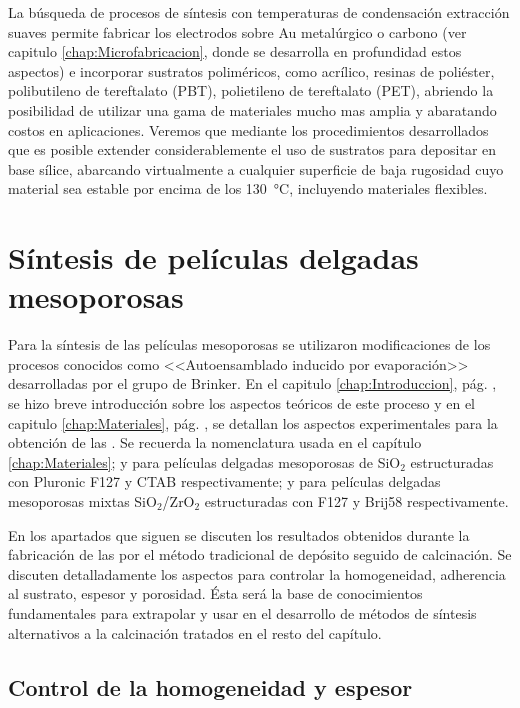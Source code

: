	La búsqueda de procesos de síntesis con temperaturas de condensación extracción suaves permite fabricar los electrodos sobre Au metalúrgico o carbono (ver capitulo \ref{chap:Microfabricacion}, donde se desarrolla en profundidad estos aspectos) e incorporar sustratos poliméricos, como acrílico, resinas de poliéster, polibutileno de tereftalato (PBT), polietileno de tereftalato (PET), abriendo la posibilidad de utilizar una gama de materiales mucho mas amplia y abaratando costos en aplicaciones.	Veremos que mediante los procedimientos desarrollados que es posible extender considerablemente el uso de sustratos para depositar \pdm\space en base sílice, abarcando virtualmente a cualquier superficie de baja rugosidad cuyo material sea estable por encima de los \SI{130}{\celsius}, incluyendo materiales flexibles.
	
\section{Síntesis de películas delgadas mesoporosas}
		
		Para la síntesis de las películas mesoporosas se utilizaron modificaciones de los procesos conocidos como <<Autoensamblado inducido por evaporación>> desarrolladas por el grupo de Brinker.\cite{Brinker1999} En el capitulo \ref{chap:Introduccion}, pág. \pageref{sec:mesoporosos}, se hizo breve introducción sobre los aspectos teóricos de este proceso y en el capitulo \ref{chap:Materiales}, pág. \pageref{sec:sintesis_mesoporosos}, se detallan los aspectos experimentales para la obtención de las \pdm. Se recuerda la nomenclatura usada en el capítulo \ref{chap:Materiales}; \pdmF\space y \pdmC\space para películas delgadas mesoporosas de SiO$_2$ estructuradas con Pluronic F127 y CTAB respectivamente; \pdmZ\space y \pdmZB\space para películas delgadas mesoporosas mixtas SiO$_2$/ZrO$_2$ estructuradas con F127 y Brij58 respectivamente.

		En los apartados que siguen se discuten los resultados obtenidos durante la fabricación de las \pdm\space por el método tradicional de depósito seguido de calcinación. Se discuten detalladamente los aspectos para controlar la homogeneidad, adherencia al sustrato, espesor y porosidad. Ésta será la base de conocimientos fundamentales para extrapolar y usar en el desarrollo de métodos de síntesis alternativos a la calcinación tratados en el resto del capítulo.

	\subsection{Control de la homogeneidad y espesor}
		

